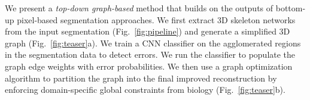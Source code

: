 %
%


We present a \textit{top-down graph-based} method that builds on the outputs of bottom-up pixel-based segmentation approaches. We first extract 3D skeleton networks from the input segmentation (Fig.~\ref{fig:pipeline}) and generate a simplified 3D graph (Fig.~\ref{fig:teaser}a). We train a CNN classifier on the agglomerated regions in the segmentation data to detect errors. We run the classifier to populate the graph edge weights with error probabilities. We then use a graph optimization algorithm to partition the graph into the final improved reconstruction by enforcing domain-specific global constraints from biology (Fig.~\ref{fig:teaser}b).

